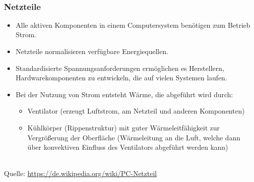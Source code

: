 ~\\
\begin{minipage}[t]{0.7\textwidth}
	\subsubsection{Netzteile}
	\begin{itemize}
		\item Alle aktiven Komponenten in einem Computersystem benötigen zum Betrieb Strom.
		\item Netzteile normalisieren verfügbare Energiequellen. 
		\item Standardisierte Spannungsanforderungen ermöglichen es Herstellern, Hardwarekomponenten zu entwickeln, die auf vielen Systemen laufen.
		\item Bei der Nutzung von Strom entsteht Wärme, die abgeführt wird durch:
		\begin{itemize}
			\item Ventilator (erzeugt Luftstrom, am Netzteil und anderen Komponenten)
			\item Kühlkörper (Rippenstruktur) mit guter Wärmeleitfähigkeit zur Vergrößerung der Oberfläche (Wärmeleitung an die Luft, welche dann über konvektiven Einfluss des Ventilators abgeführt werden kann)
		\end{itemize}
	\end{itemize}
\end{minipage}
\begin{minipage}[t]{0.3\textwidth}
	\centering
	~\\
	\tiny
	Quelle: \url{https://de.wikipedia.org/wiki/PC-Netzteil}
\end{minipage}

